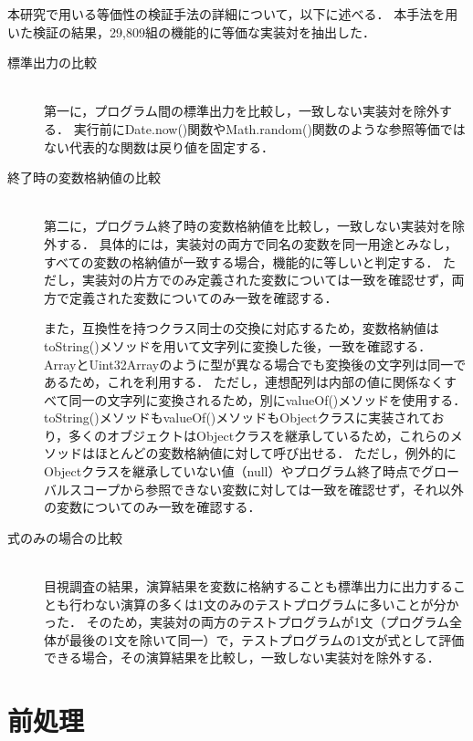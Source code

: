 \documentclass[11pt]{jreport}
\newcommand{\fix}[1]{#1}
\begin{document}
本研究で用いる等価性の検証手法の詳細について，以下に述べる．
本手法を用いた検証の結果，29,809組の\fix{機能的に等価}な実装対を抽出した．


\begin{description}

\item[標準出力の比較]\mbox{}\\
第一に，プログラム間の標準出力を比較し，一致しない実装対を除外する．
実行前にDate.now()関数やMath.random()関数のような参照等価ではない代表的な関数は戻り値を固定する．

\item[終了時の変数格納値の比較]\mbox{}\\
第二に，プログラム終了時の変数格納値を比較し，一致しない実装対を除外する．
具体的には，実装対の両方で同名の変数を同一用途とみなし，すべての変数の格納値が一致する場合，機能的に等しいと判定する．
ただし，実装対の片方でのみ定義された変数については一致を確認せず，両方で定義された変数についてのみ一致を確認する．

また，互換性を持つクラス同士の交換に対応するため，変数格納値はtoString()メソッドを用いて文字列に変換した後，一致を確認する．
ArrayとUint32Arrayのように型が異なる場合でも変換後の文字列は同一であるため，これを利用する．
ただし，連想配列は内部の値に関係なくすべて同一の文字列に変換されるため，別にvalueOf()メソッドを使用する．
toString()メソッドもvalueOf()メソッドもObjectクラスに実装されており，多くのオブジェクトはObjectクラスを継承しているため，これらのメソッドはほとんどの変数格納値に対して呼び出せる．
ただし，例外的にObjectクラスを継承していない値（null）やプログラム終了時点でグローバルスコープから参照できない変数に対しては一致を確認せず，それ以外の変数についてのみ一致を確認する．

\item[式のみの場合の比較]\mbox{}\\
目視調査の結果，演算結果を変数に格納することも標準出力に出力することも行わない演算の多くは1文のみのテストプログラムに多いことが分かった．
そのため，実装対の両方のテストプログラムが1文（プログラム全体が最後の1文を除いて同一）で，テストプログラムの1文が式として評価できる場合，その演算結果を比較し，一致しない実装対を除外する．

\end{description}




\section{前処理}\label{chapter:dataset:prep}
\end{document}
